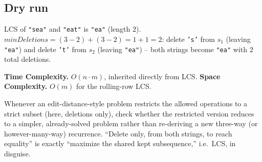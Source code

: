 \subsection*{Dry run}


LCS of \texttt{"sea"} and \texttt{"eat"} is \texttt{"ea"} (length $2$).
$\textit{minDeletions} = (3-2)+(3-2) = 1+1 = 2$: delete \texttt{'s'}
from $s_1$ (leaving \texttt{"ea"}) and delete \texttt{'t'} from $s_2$
(leaving \texttt{"ea"}) -- both strings become \texttt{"ea"} with $2$
total deletions.

\begin{complexitybox}
\textbf{Time Complexity.} $O(n \cdot m)$, inherited directly from LCS.
\textbf{Space Complexity.} $O(m)$ for the rolling-row LCS.
\end{complexitybox}

\begin{takeawaybox}
Whenever an edit-distance-style problem restricts the allowed operations
to a strict subset (here, deletions only), check whether the restricted
version reduces to a simpler, already-solved problem rather than
re-deriving a new three-way (or however-many-way) recurrence. ``Delete
only, from both strings, to reach equality'' is exactly ``maximize the
shared kept subsequence,'' i.e.\ LCS, in disguise.
\end{takeawaybox}
